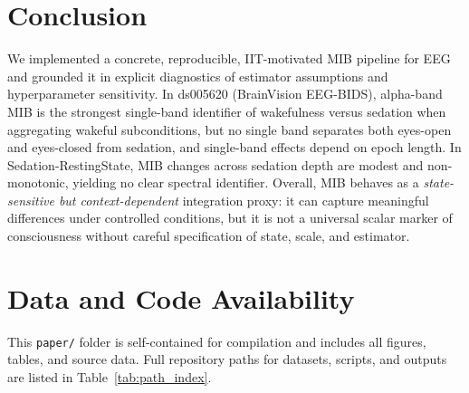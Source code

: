 \documentclass[11pt]{article}
\begin{document}
\section{Conclusion}
We implemented a concrete, reproducible, IIT-motivated MIB pipeline for EEG and grounded it in explicit diagnostics of estimator assumptions and hyperparameter sensitivity. In ds005620 (BrainVision EEG-BIDS), alpha-band MIB is the strongest single-band identifier of wakefulness versus sedation when aggregating wakeful subconditions, but no single band separates both eyes-open and eyes-closed from sedation, and single-band effects depend on epoch length. In Sedation-RestingState, MIB changes across sedation depth are modest and non-monotonic, yielding no clear spectral identifier. Overall, MIB behaves as a \emph{state-sensitive but context-dependent} integration proxy: it can capture meaningful differences under controlled conditions, but it is not a universal scalar marker of consciousness without careful specification of state, scale, and estimator.

\section*{Data and Code Availability}
This \texttt{paper/} folder is self-contained for compilation and includes all figures, tables, and source data. Full repository paths for datasets, scripts, and outputs are listed in Table~\ref{tab:path_index}.
\end{document}
